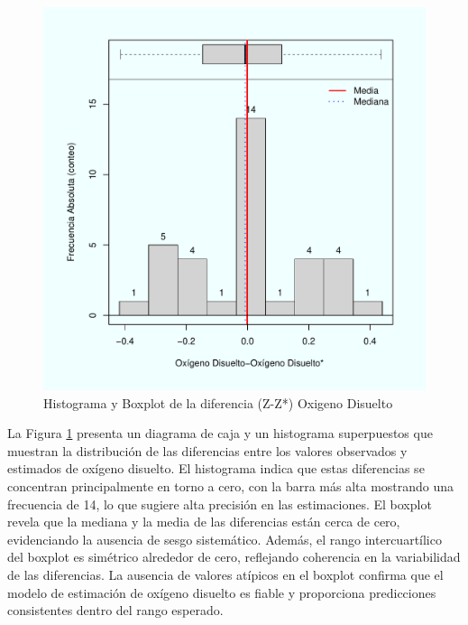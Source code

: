 \begin{figure}[!htb]
    \centering
    \includegraphics[width=0.6\linewidth]{Figuras_AED//VARIO_OD/OD-OD+_HistBoxPlot1.pdf}
    \caption{Histograma y Boxplot de la diferencia (Z-Z*)  Oxigeno Disuelto}
    \label{fig:enter-labee4l}
\end{figure}


 La Figura \ref{fig:enter-labee4l} presenta un diagrama de caja y un histograma superpuestos que muestran la distribución de las diferencias entre los valores observados y estimados de oxígeno disuelto. El histograma indica que estas diferencias se concentran principalmente en torno a cero, con la barra más alta mostrando una frecuencia de 14, lo que sugiere alta precisión en las estimaciones. El boxplot revela que la mediana y la media de las diferencias están cerca de cero, evidenciando la ausencia de sesgo sistemático. Además, el rango intercuartílico del boxplot es simétrico alrededor de cero, reflejando coherencia en la variabilidad de las diferencias. La ausencia de valores atípicos en el boxplot confirma que el modelo de estimación de oxígeno disuelto es fiable y proporciona predicciones consistentes dentro del rango esperado.



